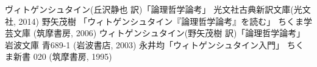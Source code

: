 \documentclass[11pt,a4paper]{jsbook}
\begin{document}
\begin{thebibliography}{9}
  ヴィトゲンシュタイン(丘沢静也 訳)「論理哲学論考」 光文社古典新訳文庫(光文社, 2014)
  野矢茂樹 「ウィトゲンシュタイン『論理哲学論考』を読む」 ちくま学芸文庫 (筑摩書房, 2006)
  ウィトゲンシュタイン(野矢茂樹 訳)「論理哲学論考」 岩波文庫 青689-1 (岩波書店, 2003)
  永井均「ウィトゲンシュタイン入門」 ちくま新書 020 (筑摩書房, 1995)
\end{thebibliography}
\end{document}
